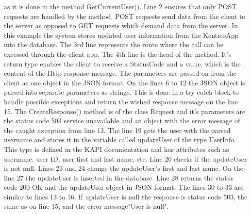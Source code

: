 as it is done in the method GetCurrentUser().
Line 2 ensures that only POST requests are handled by the method. POST requests send data from the client to the server as opposed to GET requests which demand data from the server. In this example the system stores updated user information from the KenticoApp into the database. The 3rd line represents the route where the call can be excessed through the client app. The 4th line is the head of the method. It's return type enables the client to receive a StatusCode and a value, which is the content of the Http response message. The parameters are passed on from the client as one object in the JSON format. On the lines 6 to 12 the JSON object is parsed into separate parameters as strings. This is done in a try-catch block to handle possible exceptions and return the wished response message on the line 15. The CreateResponse() method is of the class Request and it's parameters are the status code 503 service unavailable and an object with the error message of the caught exception from line 13. The line 19 gets the user with the parsed username and stores it in the variable called updateUser of the type UserInfo. This type is defined in the KAPI documentation and has attributes such as username, user ID, user first and last name, etc. Line 20 checks if the updateUser is not null. Lines 23 and 24 change the updateUser's first and last name. On the line 27 the updateUser is inserted in the database. Line 28 returns the status code 200 OK and the updateUser object in JSON format. The lines 30 to 33 are similar to lines 13 to 16. If updateUser is null the response is status code 503, the same as on line 15, and the error message"User is null". 


